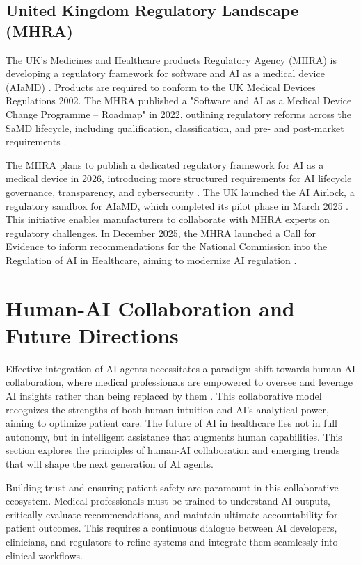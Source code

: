\documentclass[12pt,a4paper]{article}
\begin{document}
\subsection{United Kingdom Regulatory Landscape (MHRA)}
\label{subsec:uk-regulation}
The UK's Medicines and Healthcare products Regulatory Agency (MHRA) is developing a regulatory framework for software and AI as a medical device (AIaMD) \cite{gov_uk_mhra_roadmap}. Products are required to conform to the UK Medical Devices Regulations 2002. The MHRA published a "Software and AI as a Medical Device Change Programme – Roadmap" in 2022, outlining regulatory reforms across the SaMD lifecycle, including qualification, classification, and pre- and post-market requirements \cite{gov_uk_mhra_roadmap}.

The MHRA plans to publish a dedicated regulatory framework for AI as a medical device in 2026, introducing more structured requirements for AI lifecycle governance, transparency, and cybersecurity \cite{gov_uk_mhra_roadmap}. The UK launched the AI Airlock, a regulatory sandbox for AIaMD, which completed its pilot phase in March 2025 \cite{gov_uk_mhra_roadmap}. This initiative enables manufacturers to collaborate with MHRA experts on regulatory challenges. In December 2025, the MHRA launched a Call for Evidence to inform recommendations for the National Commission into the Regulation of AI in Healthcare, aiming to modernize AI regulation \cite{gov_uk_mhra_roadmap}.

\section{Human-AI Collaboration and Future Directions}
\label{sec:human-ai-collaboration}
Effective integration of AI agents necessitates a paradigm shift towards human-AI collaboration, where medical professionals are empowered to oversee and leverage AI insights rather than being replaced by them \cite{topol2019deep}. This collaborative model recognizes the strengths of both human intuition and AI's analytical power, aiming to optimize patient care. The future of AI in healthcare lies not in full autonomy, but in intelligent assistance that augments human capabilities. This section explores the principles of human-AI collaboration and emerging trends that will shape the next generation of AI agents.

Building trust and ensuring patient safety are paramount in this collaborative ecosystem. Medical professionals must be trained to understand AI outputs, critically evaluate recommendations, and maintain ultimate accountability for patient outcomes. This requires a continuous dialogue between AI developers, clinicians, and regulators to refine systems and integrate them seamlessly into clinical workflows.
\end{document}
